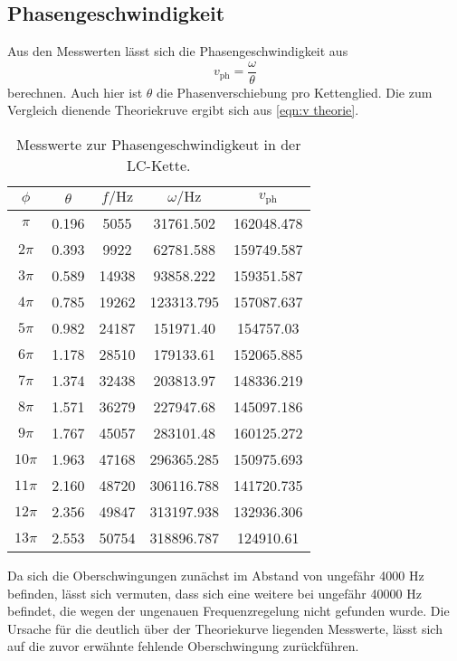   \subsection{Phasengeschwindigkeit}
  Aus den Messwerten lässt sich die Phasengeschwindigkeit aus
  \begin{equation}
    v_\mathrm{ph} = \frac{\omega}{\theta}
  \end{equation}
  berechnen. Auch hier ist $\theta$ die Phasenverschiebung pro Kettenglied.
  Die zum Vergleich dienende Theoriekruve ergibt sich aus \ref{eqn:v theorie}.

  \begin{table}
    \centering
    \caption{Messwerte zur Phasengeschwindigkeut in der LC-Kette.}
    \label{tab:dispersion1}
    \begin{tabular}{c c c c c}
      \toprule
      $\phi$ & $\theta$ & $f / \si{\hertz}$ & $\omega / \si{\hertz}$ & $v_\mathrm{ph}$ \\
      \midrule
$\pi$ & 0.196 & 5055 & 31761.502 & 162048.478 \\
$2\pi$ & 0.393 &  9922 &  62781.588 & 159749.587 \\
$3\pi$ & 0.589 & 14938 & 93858.222 & 159351.587 \\
$4\pi$ & 0.785 & 19262 & 123313.795 & 157087.637 \\
$5\pi$ & 0.982 & 24187 & 151971.40 & 154757.03 \\
$6\pi$ & 1.178 & 28510 & 179133.61 & 152065.885 \\
$7\pi$ & 1.374 & 32438 & 203813.97 & 148336.219 \\
$8\pi$ &  1.571 & 36279 & 227947.68 & 145097.186 \\
$9\pi$ & 1.767 & 45057 & 283101.48 & 160125.272 \\
$10\pi$ &  1.963 & 47168 & 296365.285 & 150975.693 \\
$11\pi$ & 2.160 & 48720 & 306116.788 & 141720.735 \\
$12\pi$ & 2.356 & 49847 & 313197.938 & 132936.306 \\
$13\pi$ & 2.553 & 50754 & 318896.787 & 124910.61 \\
\bottomrule
\end{tabular}
\end{table}

Da sich die Oberschwingungen zunächst im Abstand von ungefähr 4000 \si{\Hz} befinden, lässt sich vermuten, dass sich eine weitere bei ungefähr 40000 \si{\Hz} befindet, die wegen der ungenauen Frequenzregelung nicht gefunden wurde.
Die Ursache für die deutlich über der Theoriekurve liegenden Messwerte, lässt sich auf die zuvor erwähnte fehlende Oberschwingung zurückführen.

